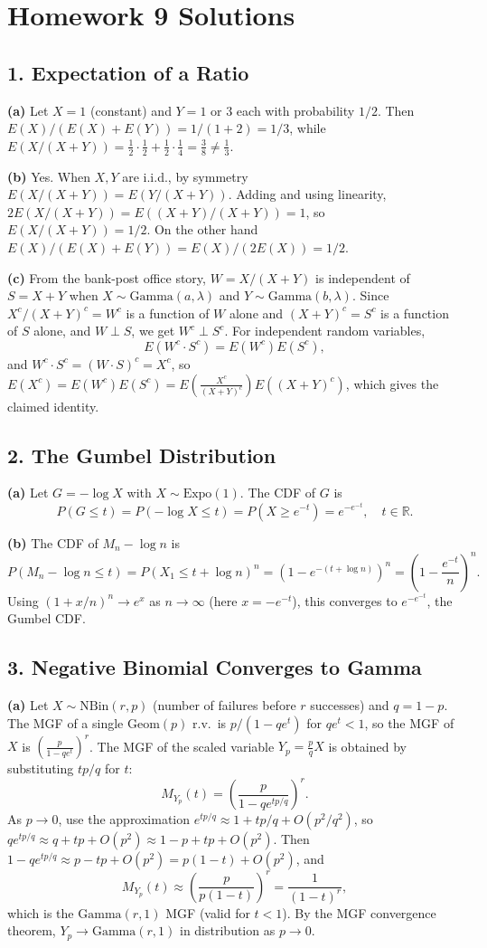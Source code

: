\documentclass{article}
\begin{document}
\bigskip
\section*{Homework 9 Solutions}

\subsection*{1. Expectation of a Ratio}

\textbf{(a)} Let $X=1$ (constant) and $Y=1$ or $3$ each with probability $1/2$. Then $E(X)/(E(X)+E(Y))=1/(1+2)=1/3$, while $E(X/(X+Y))=\frac{1}{2}\cdot\frac{1}{2}+\frac{1}{2}\cdot\frac{1}{4}=\frac{3}{8}\ne\frac{1}{3}$.

\textbf{(b)} Yes. When $X,Y$ are i.i.d., by symmetry $E(X/(X+Y))=E(Y/(X+Y))$. Adding and using linearity, $2E(X/(X+Y))=E((X+Y)/(X+Y))=1$, so $E(X/(X+Y))=1/2$. On the other hand $E(X)/(E(X)+E(Y))=E(X)/(2E(X))=1/2$.

\textbf{(c)} From the bank-post office story, $W=X/(X+Y)$ is independent of $S=X+Y$ when $X\sim\text{Gamma}(a,\lambda)$ and $Y\sim\text{Gamma}(b,\lambda)$. Since $X^c/(X+Y)^c=W^c$ is a function of $W$ alone and $(X+Y)^c=S^c$ is a function of $S$ alone, and $W\perp S$, we get $W^c\perp S^c$. For independent random variables,
$$
E(W^c\cdot S^c)=E(W^c)E(S^c),
$$
and $W^c\cdot S^c = (W\cdot S)^c = X^c$, so $E(X^c)=E(W^c)E(S^c)=E\!\left(\frac{X^c}{(X+Y)^c}\right)E((X+Y)^c)$, which gives the claimed identity.

\subsection*{2. The Gumbel Distribution}

\textbf{(a)} Let $G=-\log X$ with $X\sim\text{Expo}(1)$. The CDF of $G$ is
$$
P(G\le t)=P(-\log X\le t)=P(X\ge e^{-t})=e^{-e^{-t}}, \quad t\in\mathbb{R}.
$$

\textbf{(b)} The CDF of $M_n-\log n$ is
$$
P(M_n-\log n\le t)=P(X_1\le t+\log n)^n=(1-e^{-(t+\log n)})^n=\left(1-\frac{e^{-t}}{n}\right)^n.
$$
Using $(1+x/n)^n\to e^x$ as $n\to\infty$ (here $x=-e^{-t}$), this converges to $e^{-e^{-t}}$, the Gumbel CDF.

\subsection*{3. Negative Binomial Converges to Gamma}

\textbf{(a)} Let $X\sim\text{NBin}(r,p)$ (number of failures before $r$ successes) and $q=1-p$. The MGF of a single $\text{Geom}(p)$ r.v.\ is $p/(1-qe^t)$ for $qe^t<1$, so the MGF of $X$ is $\left(\frac{p}{1-qe^t}\right)^r$. The MGF of the scaled variable $Y_p=\frac{p}{q}X$ is obtained by substituting $tp/q$ for $t$:
$$
M_{Y_p}(t)=\left(\frac{p}{1-qe^{tp/q}}\right)^r.
$$
As $p\to0$, use the approximation $e^{tp/q}\approx1+tp/q+O(p^2/q^2)$, so $qe^{tp/q}\approx q+tp+O(p^2)\approx1-p+tp+O(p^2)$. Then $1-qe^{tp/q}\approx p-tp+O(p^2)=p(1-t)+O(p^2)$, and
$$
M_{Y_p}(t)\approx\left(\frac{p}{p(1-t)}\right)^r=\frac{1}{(1-t)^r},
$$
which is the $\text{Gamma}(r,1)$ MGF (valid for $t<1$). By the MGF convergence theorem, $Y_p\to\text{Gamma}(r,1)$ in distribution as $p\to0$.
\end{document}
